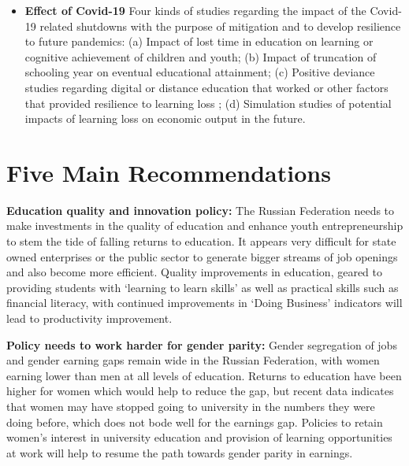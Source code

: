 \documentclass[alpha-refs]{wiley-article-04t}
\begin{document}
\begin{itemize}
\item \textbf{Effect of Covid-19} Four kinds of 
studies regarding the impact of the Covid-19 related shutdowns with the 
purpose of mitigation and to develop resilience 
to future pandemics: (a) Impact of lost time in education on learning or 
cognitive achievement of children and youth; (b) Impact of truncation of 
schooling year on eventual educational attainment; (c) Positive deviance 
studies regarding digital or distance education that worked or other 
factors that provided resilience to learning loss \parencite{pascale2010}; 
(d) Simulation studies of potential impacts of learning loss on economic 
output in the future. 
	
\end{itemize}



\section{Five Main Recommendations}

\textbf{Education quality and innovation policy:} The 
Russian Federation needs to make investments in the quality of education 
and enhance youth entrepreneurship to stem the tide of falling returns to 
education. It appears very difficult for state owned enterprises or the 
public sector to generate bigger streams of job openings and also become 
more efficient. Quality improvements in education, geared to providing 
students with `learning to learn skills' as well as practical skills such 
as financial literacy, with continued improvements in `Doing Business' 
indicators will lead to productivity improvement. 
\vspace{0.4em} 

\hspace{-1.8em} \textbf{Policy needs to work harder for gender parity:} 
Gender segregation of jobs and gender earning gaps remain wide in the 
Russian Federation, with women earning lower than men at all levels of 
education. Returns to education have been higher for women which would help 
to reduce the gap, but recent data indicates that women may have stopped 
going to university in the numbers they were doing before, which does not 
bode well for the earnings gap. Policies to retain women's interest in 
university education and provision of learning opportunities at work will 
help to resume the path towards gender parity in earnings.   

\vspace{0.4em} 
\end{document}
